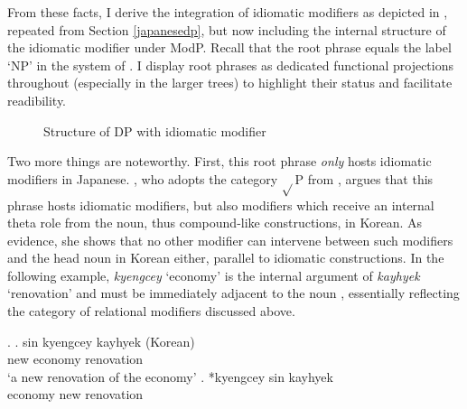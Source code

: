 From these facts, I derive the integration of idiomatic modifiers as depicted in , repeated from Section \ref{japanesedp}, but now including the internal structure of the idiomatic modifier under ModP. Recall that the root phrase equals the label `NP' in the system of \citet{svenonius:2008:position}. I display root phrases as dedicated functional projections throughout (especially in the larger trees) to highlight their status and facilitate readibility.

 \begin{figure}
\centering
{}
\caption{Structure of DP with idiomatic modifier}
\label{Structure idiomatic DP}
\end{figure}

Two more things are noteworthy. First, this root phrase \textit{only} hosts idiomatic modifiers in Japanese. \citet[130]{kim:2019:syntax}, who adopts the category $\sqrt{}$P from \citet{svenonius:2008:position}, argues that this phrase hosts idiomatic modifiers, but also modifiers which receive an internal theta role from the noun, thus compound-like constructions, in Korean. As evidence, she shows that no other modifier can intervene between such modifiers and the head noun in Korean either, parallel to idiomatic constructions. In the following example, \textit{kyengcey} `economy' is the internal argument of \textit{kayhyek} `renovation' and must be immediately adjacent to the noun \citep[130]{kim:2019:syntax}, essentially reflecting the category of relational modifiers discussed above. 

\ex. \ag. sin kyengcey kayhyek (Korean)\\
new economy renovation\\
`a new renovation of the economy'
\bg. *kyengcey sin kayhyek\\
economy new renovation \null \hfill \citep[130]{kim:2019:syntax}\\

